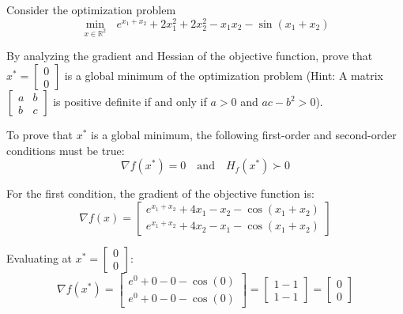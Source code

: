 \begin{homeworkProblem}
    
    Consider the optimization problem
    \begin{equation}
        \min_{x \in \mathbb R^2} \ \ \ e^{x_1+x_2} + 2x_1^2 + 2x_2^2 - x_1x_2
        - \sin(x_1+x_2)
    \end{equation}

    By analyzing the gradient and Hessian of the objective function, prove that 
    $x^* = \left[ \begin{array}{c} 0 \\ 0 \end{array} \right]$ is a global 
    minimum of the optimization problem (Hint: A matrix $\left[ \begin{array}{cc} 
    a & b \\ b & c \end{array} \right]$ is positive definite if and only if 
    $a > 0$ and $ac - b^2 > 0$). 
        
    \begin{solution}[Proof]

        To prove that \(x^*\) is a global minimum, the following first-order and 
        second-order conditions must be true:
        \[
            \nabla f(x^*) = 0 \quad \text{and} \quad H_f(x^*) \succ 0
        \]

        For the first condition, the gradient of the objective function is:
        \[
            \nabla f(x) = \left[ \begin{array}{c}
                e^{x_1 + x_2} + 4x_1 - x_2 - \cos(x_1 + x_2) \\
                e^{x_1 + x_2} + 4x_2 - x_1 - \cos(x_1 + x_2)
            \end{array} \right]
        \]

        Evaluating at \(x^* = \left[ \begin{array}{c} 0 \\ 0 \end{array} \right]\):
        \[
            \nabla f(x^*) = \left[ \begin{array}{c}
                e^0 + 0 - 0 - \cos(0) \\
                e^0 + 0 - 0 - \cos(0)
            \end{array} \right] = \left[ \begin{array}{c} 1 - 1 \\ 1 - 1 \end{array} \right] = \left[ \begin{array}{c} 0 \\ 0 \end{array} \right]
        \]


\end{solution}
\end{homeworkProblem}
